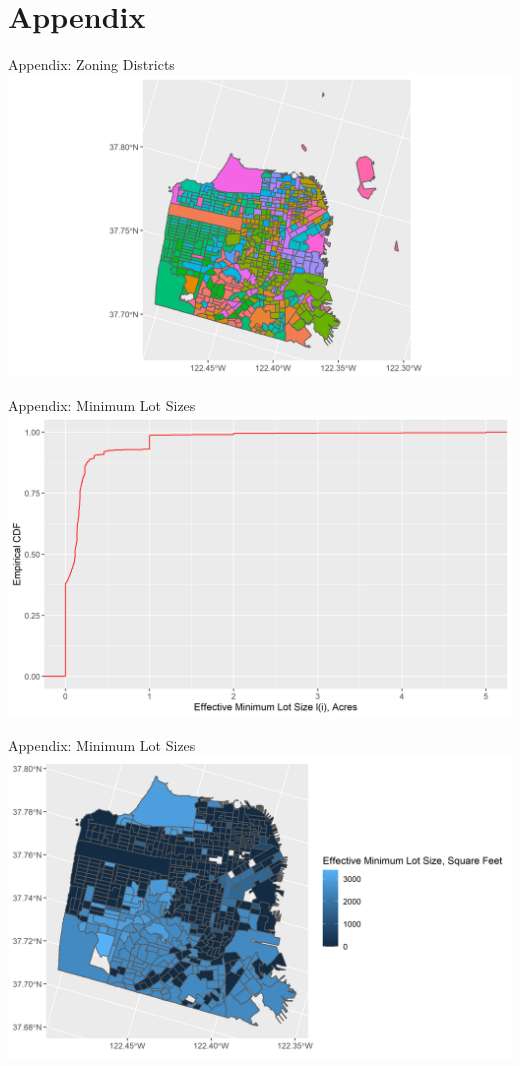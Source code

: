 \documentclass{beamer}
\begin{document}


\section{Appendix}
\begin{frame}{Appendix: Zoning Districts}\label{zoning}
		\includegraphics[width = \textwidth]{SF_MAP.png}
		\hyperlink{returnZoningDist}{} 
\end{frame}

\begin{frame}{Appendix: Minimum Lot Sizes} \label{lotsizecdf}
\includegraphics[width = \textwidth]{ECDFDensRegulation.png}
\end{frame}

\begin{frame}{Appendix: Minimum Lot Sizes}\label{SF_lotsize}
	\includegraphics[width = \textwidth]{SF_EFFMINLOTSIZE.png}
	\hyperlink{returnLotSize}{} 
\end{frame}
\end{document}
